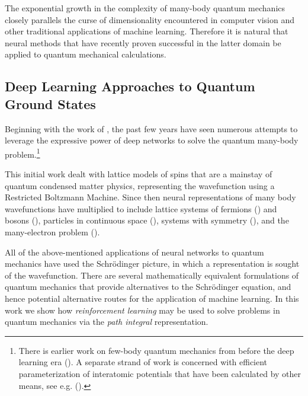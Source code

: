 \documentclass[12pt]{msml2020} %
\begin{document}
The exponential growth in the complexity of many-body quantum mechanics closely parallels the curse of dimensionality encountered in computer vision and other traditional applications of machine learning. Therefore it is natural that neural methods that have recently proven successful in the latter domain be applied to quantum mechanical calculations.


\subsection{Deep Learning Approaches to Quantum Ground States} \label{sec:dlq}

Beginning with the work of \cite{Carleo:2017aa}, the past few years have seen numerous attempts to leverage the expressive power of deep networks to solve the quantum many-body problem.\footnote{There is earlier work on few-body quantum mechanics from before the deep learning era (\cite{Lagaris:1997aa}). A separate strand of work is concerned with efficient parameterization of interatomic potentials that have been calculated by other means, see e.g. (\cite{Behler:2016aa}).}

This initial work dealt with lattice models of spins that are a mainstay of quantum condensed matter physics, representing the wavefunction using a Restricted Boltzmann Machine. Since then neural representations of many body wavefunctions have multiplied to include lattice systems of fermions (\cite{Nomura:2017aa}) and bosons (\cite{Saito:2017aa}), particles in continuous space (\cite{Ruggeri:2018aa,Kessler:2019aa}), systems with symmetry (\cite{Choo:2018aa}), and the many-electron problem (\cite{Han:2019aa,Pfau:2019aa,Hermann:2019aa}).


All of the above-mentioned applications of neural networks to quantum mechanics have used the Schr\"odinger picture, in which a representation is sought of the wavefunction. There are several mathematically equivalent formulations of quantum mechanics that provide alternatives to the Schr\"odinger equation, and hence potential alternative routes for the application of machine learning. In this work we show how \emph{reinforcement learning} may be used to solve problems in quantum mechanics via the \emph{path integral} representation.
\end{document}
